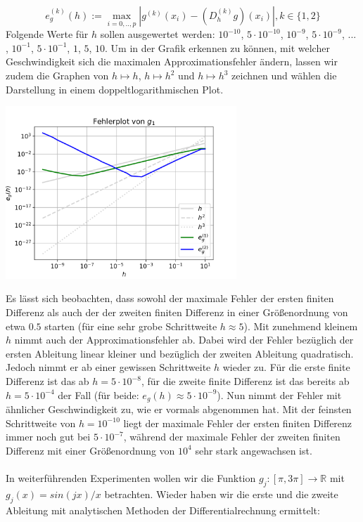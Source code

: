 \documentclass{scrartcl}
\newcommand{\abs}[1]{\left\lvert#1\right\rvert}
\begin{document}
\[e_g^{(k)}(h):=\max_{i=0,..,p}\abs{g^{(k)}(x_i)-(D_h^{(k)}g)(x_i)} , k \in \lbrace1, 2\rbrace\]
Folgende Werte für $h$ sollen ausgewertet werden: $10^{-10}$, $5 \cdot 10^{-10}$, $10^{-9}$, $5 \cdot 10^{-9}$, ... , $10^{-1}$, \linebreak  $5 \cdot 10^{-1}$, $1$, $5$, $10$.
Um in der Grafik erkennen zu können, mit welcher Geschwindigkeit sich die maximalen Approximationsfehler ändern, lassen wir zudem die Graphen von $h \mapsto h$, $h \mapsto h^{2}$ und $h \mapsto h^{3}$ zeichnen und wählen die Darstellung in einem doppeltlogarithmischen Plot.
\begin{center}
	\includegraphics[width=0.65\textwidth]{Grafiken/Fehlerplot_Aufgabe2}
  \vspace{-0.2cm}
  \vspace{0.5cm}
\end{center}
Es lässt sich beobachten, dass sowohl der maximale Fehler der ersten finiten Differenz als auch der der zweiten finiten Differenz in einer Größenordnung von etwa $0.5$ starten (für eine sehr grobe Schrittweite $h \approx 5$). Mit zunehmend kleinem $h$ nimmt auch der Approximationsfehler ab. Dabei wird der Fehler bezüglich der ersten Ableitung linear kleiner und bezüglich der zweiten Ableitung quadratisch. Jedoch nimmt er ab einer gewissen Schrittweite $h$ wieder zu. Für die erste finite Differenz ist das ab $h = 5\cdot10^{-8}$, für die zweite finite Differenz ist das bereits ab $h = 5 \cdot 10^{-4}$ der Fall (für beide: $e_g(h) \approx  5 \cdot 10^{-9}$). Nun nimmt der Fehler mit ähnlicher Geschwindigkeit zu, wie er vormals abgenommen hat. Mit der feinsten Schrittweite von $h = 10^{-10}$ liegt der maximale Fehler der ersten finiten Differenz immer noch gut bei $5 \cdot 10^{-7}$, während der maximale Fehler der zweiten finiten Differenz mit einer Größenordnung von $10^{4}$ sehr stark angewachsen ist. \\
 \\
In weiterführenden Experimenten wollen wir die Funktion $g_j:[\pi, 3\pi] \rightarrow \mathbb{R}$ mit $g_j(x) = sin(j x)/x$ betrachten. Wieder haben wir die erste und die zweite Ableitung mit analytischen Methoden der Differentialrechnung ermittelt:
\end{document}
